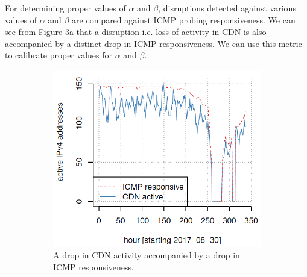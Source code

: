 \documentclass[11pt,twoside,a4paper]{article}
\begin{document}
For determining proper values of $\alpha$ and $\beta$, disruptions detected against various values of $\alpha$ and $\beta$ are compared against ICMP probing responsiveness. We can see from \hyperref[fig:CDNAndICMP]{Figure 3a} that a disruption i.e. loss of activity in CDN is also accompanied by a distinct drop in ICMP responsiveness. We can use this metric to calibrate proper values for $\alpha$ and $\beta$.
\begin{figure}[h!]
  
  \begin{subfigure}[b]{80mm}
    \includegraphics[width=\linewidth]{3a.png}
    \caption{A drop in CDN activity accompanied by a drop in ICMP responsiveness.\newline\newline}
  \end{subfigure}
  \begin{subfigure}[b]{75mm}  \hspace{5mm}
    {}

\end{subfigure}
\end{figure}
\end{document}
